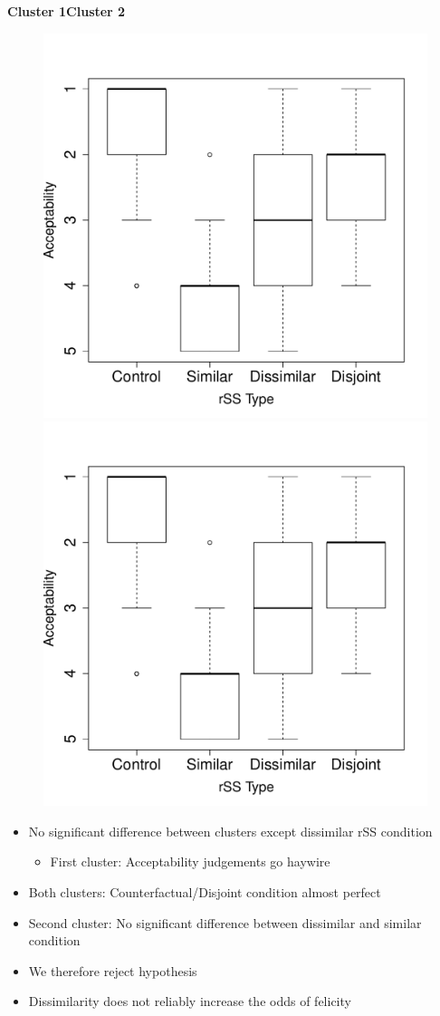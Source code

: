 \begin{frame}[t]
    \subsectionpage\vskip 7.5pt
    \hspace*{45mm}\textbf{Cluster 1}\hspace{72.5mm}\textbf{Cluster 2}\vspace{-7.5mm}
    \begin{figure}[ht!]
\begin{minipage}{0.9\linewidth}
\includegraphics[width=0.425\linewidth,page=1]{graphics/boxplots.pdf}\hspace{10mm}
\includegraphics[width=0.425\linewidth,page=2]{graphics/boxplots.pdf}
\end{minipage}%
\end{figure}
\end{frame}

\begin{frame}[t]
\subsectionpage\vskip 9pt
\begin{itemize}
    \item<1-> No significant difference between clusters except dissimilar rSS condition\vskip 9pt
        \begin{itemize}
            \item<1-> First cluster: Acceptability judgements go haywire\vskip 9pt
        \end{itemize}
    \item<1-> Both clusters: Counterfactual/Disjoint condition almost perfect\vskip 9pt
    \item<1-> Second cluster: No significant difference between dissimilar and similar condition\vskip 18pt
    \item<2-> We therefore reject  hypothesis\vskip 9pt
    \item<3-> Dissimilarity does not reliably increase the odds of felicity
\end{itemize}
\end{frame}

